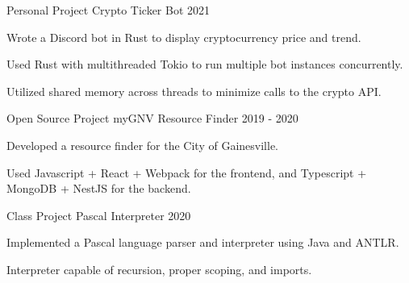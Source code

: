 

\begin{cventries}

  \cventry
    {Personal Project} %
    {Crypto Ticker Bot} %
    {} %
    {2021} %
    {
      \begin{cvitems} %
        \item {Wrote a Discord bot in Rust to display cryptocurrency price and trend.}
        \item {Used Rust with multithreaded Tokio to run multiple bot instances concurrently.}
        \item {Utilized shared memory across threads to minimize calls to the crypto API.}
      \end{cvitems}
    }

  \cventry
    {Open Source Project} %
    {myGNV Resource Finder} %
    {} %
    {2019 - 2020} %
    {
    \begin{cvitems} %
        \item {Developed a resource finder for the City of Gainesville.}
        \item {Used Javascript + React + Webpack for the frontend, and Typescript + MongoDB + NestJS for the backend.}
    \end{cvitems}
    }


  \cventry
    {Class Project} %
    {Pascal Interpreter} %
    {} %
    {2020} %
    {
      \begin{cvitems} %
        \item {Implemented a Pascal language parser and interpreter using Java and ANTLR.}
        \item {Interpreter capable of recursion, proper scoping, and imports.}
      \end{cvitems}
    }


\end{cventries}
